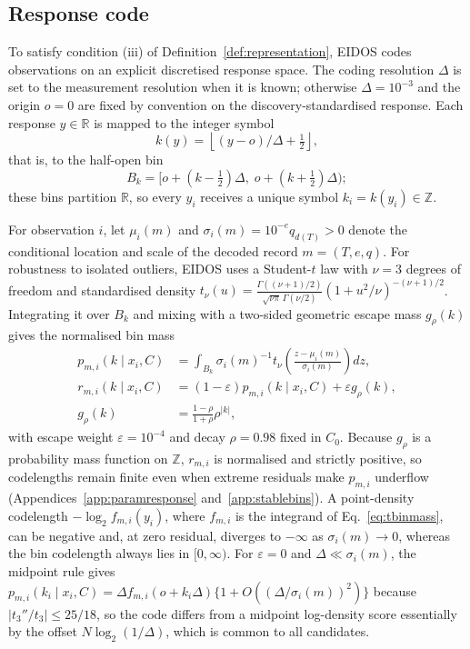 \subsection{Response code}\label{sec:representationcode}

To satisfy condition (iii) of Definition~\ref{def:representation}, EIDOS codes observations on an explicit discretised response space. The coding resolution \(\Delta\) is set to the measurement resolution when it is known; otherwise \(\Delta=10^{-3}\) and the origin \(o=0\) are fixed by convention on the discovery-standardised response. Each response \(y\in\mathbb R\) is mapped to the integer symbol
\begin{equation}\label{eq:quantizer}
k(y)=\left\lfloor (y-o)/\Delta+\tfrac12\right\rfloor,
\end{equation}
that is, to the half-open bin
\begin{equation}\label{eq:bin}
B_k=[o+(k-\tfrac12)\Delta,\;o+(k+\tfrac12)\Delta);
\end{equation}
these bins partition \(\mathbb R\), so every \(y_i\) receives a unique symbol \(k_i=k(y_i)\in\mathbb Z\).

For observation \(i\), let \(\mu_i(m)\) and \(\sigma_i(m)=10^{-e}q_{d(T)}>0\) denote the conditional location and scale of the decoded record \(m=(T,e,q)\). For robustness to isolated outliers, EIDOS uses a Student-\(t\) law with \(\nu=3\) degrees of freedom and standardised density \(t_\nu(u)=\frac{\Gamma((\nu+1)/2)}{\sqrt{\nu\pi}\,\Gamma(\nu/2)}(1+u^2/\nu)^{-(\nu+1)/2}\). Integrating it over \(B_k\) and mixing with a two-sided geometric escape mass \(g_\rho(k)\) gives the normalised bin mass
\begin{align}
p_{m,i}(k\mid x_i,C)
&=\int_{B_k}\sigma_i(m)^{-1}t_\nu\!\left(\frac{z-\mu_i(m)}{\sigma_i(m)}\right)dz,\label{eq:tbinmass}\\
r_{m,i}(k\mid x_i,C)
&=(1-\varepsilon)p_{m,i}(k\mid x_i,C)+\varepsilon g_\rho(k),\label{eq:binmass}\\
g_\rho(k)&=\frac{1-\rho}{1+\rho}\rho^{|k|},\label{eq:escape}
\end{align}
with escape weight \(\varepsilon=10^{-4}\) and decay \(\rho=0.98\) fixed in \(C_0\). Because \(g_\rho\) is a probability mass function on \(\mathbb Z\), \(r_{m,i}\) is normalised and strictly positive, so codelengths remain finite even when extreme residuals make \(p_{m,i}\) underflow (Appendices~\ref{app:paramresponse} and~\ref{app:stablebins}). A point-density codelength \(-\log_2 f_{m,i}(y_i)\), where \(f_{m,i}\) is the integrand of Eq.~\eqref{eq:tbinmass}, can be negative and, at zero residual, diverges to \(-\infty\) as \(\sigma_i(m)\to0\), whereas the bin codelength always lies in \([0,\infty)\). For \(\varepsilon=0\) and \(\Delta\ll\sigma_i(m)\), the midpoint rule gives \(p_{m,i}(k_i\mid x_i,C)=\Delta f_{m,i}(o+k_i\Delta)\{1+O((\Delta/\sigma_i(m))^2)\}\) because \(|t_3''/t_3|\le25/18\), so the code differs from a midpoint log-density score essentially by the offset \(N\log_2(1/\Delta)\), which is common to all candidates.

